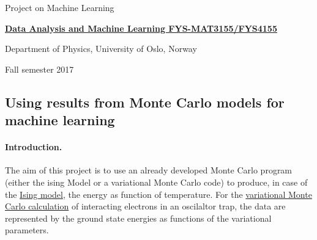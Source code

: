 \documentclass[%
oneside,                 %
final,                   %
10pt]{article}
\begin{document}

\newcommand{\exercisesection}[1]{\subsection*{#1}}






\thispagestyle{empty}

\begin{center}
{\LARGE\bf
\begin{spacing}{1.25}
Project on Machine Learning
\end{spacing}
}
\end{center}


\begin{center}
{\bf \href{{http://www.uio.no/studier/emner/matnat/fys/FYS3155/index-eng.html}}{Data Analysis and Machine Learning FYS-MAT3155/FYS4155}}
\end{center}

    \begin{center}
\centerline{{\small Department of Physics, University of Oslo, Norway}}
\end{center}
    

\begin{center}
Fall semester 2017
\end{center}

\vspace{1cm}


\subsection{Using results from Monte Carlo models for machine learning}

\paragraph{Introduction.}
The aim of this project is to use an already developed Monte Carlo program (either the ising Model or a variational Monte Carlo code) to produce, in case of the \href{{https://github.com/CompPhysics/MachineLearning/tree/master/doc/Programs/IsingModel}}{Ising model}, the energy as function of temperature. For the \href{{https://github.com/CompPhysics/MachineLearning/tree/master/doc/Programs/VMC2Electrons/}}{variational Monte Carlo calculation} of interacting electrons in an oscilaltor trap, the data are represented by the ground state energies as functions of the variational parameters.
\end{document}
